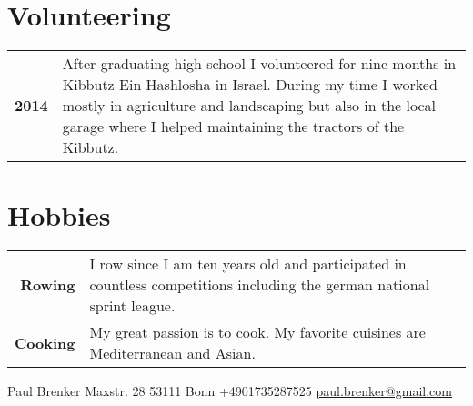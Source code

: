 \documentclass{modernsimplecv}
\newlength{\rightcolwidth}
\newlength{\leftcolwidth}
\begin{document}
\begin{paracol}{2}
\begin{minipage}[t]{\leftcolwidth}
\end{minipage}\hfill

\bigskip

\begin{minipage}[t]{\rightcolwidth}
\section*{Volunteering}
\begin{tabular}{>{\small\bfseries}r >{\small}p{}}
    2014 & After graduating high school I volunteered for nine months in Kibbutz Ein Hashlosha in Israel. During my time I worked mostly in agriculture and landscaping but also in the local garage where I helped maintaining the tractors of the Kibbutz. \\
    
\end{tabular}
\bigskip

\section*{Hobbies}
\begin{tabular}{>{\small\bfseries}r >{\small}p{}}
    Rowing & I row since I am ten years old and participated in countless competitions including the german national sprint league. \\
    Cooking & My great passion is to cook. My favorite cuisines are Mediterranean and Asian.
\end{tabular}
\end{minipage}









\end{paracol}

\vfill{} %

\setlength{\parindent}{0pt}
\begin{minipage}[t]{\textwidth}
\begin{center}\fontfamily{\sfdefault}\selectfont \color{black!70}
{\small Paul Brenker  Maxstr. 28  53111 Bonn  +4901735287525 
 \protect\url{paul.brenker@gmail.com}
}
\end{center}
\end{minipage}
\end{document}

